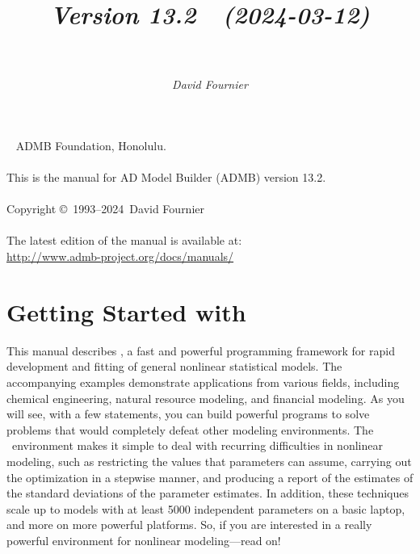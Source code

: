 \documentclass{admbmanual}
\newcommand\admbversion{13.2}
\newcommand\admbyear{2024}
\newcommand\admbdate{2024-03-12}
\begin{document}
\title{%
  \vspace{3ex}\textsf{\textit{Version \admbversion~~(\admbdate)\\[3pt]
      ~%
    }}\vspace{3ex}
}
\author{\textsf{\textit{David Fournier}}}
\maketitle

~\vfill
\noindent ADMB Foundation, Honolulu.\\\\
\noindent This is the manual for AD Model Builder (ADMB) version
\admbversion.\\\\
\noindent Copyright \copyright\ 1993--\admbyear\ David Fournier\\\\
\noindent The latest edition of the manual is available at:\\
\url{http://www.admb-project.org/docs/manuals/}

\tableofcontents

\chapter{Getting Started with \ADM}

This manual describes \ADM, a fast and powerful programming framework for rapid
development and fitting of general nonlinear statistical models. The
accompanying examples demonstrate applications from various
fields, including chemical engineering, natural resource modeling, and financial
modeling. As you will see, with a few statements, you can build powerful
programs to solve problems that would completely defeat other modeling
environments. The \ADM\ environment makes it simple to deal with recurring
difficulties in nonlinear modeling, such as restricting the values that
parameters can assume, carrying out the optimization in a stepwise manner, and
producing a report of the estimates of the standard deviations of the parameter
estimates. In addition, these techniques scale up to models with at least 5000
independent parameters on a basic laptop, and more on more powerful
platforms. So, if you are interested in a really powerful environment for
nonlinear modeling---read on!
\end{document}

